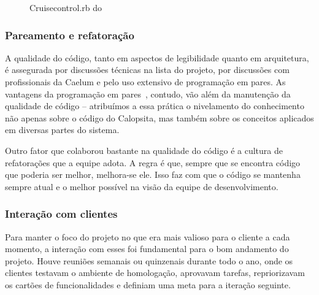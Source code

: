 \begin{figure}[H]
  \label{figura:cruisecontrol}
  \centering
  \caption{Cruisecontrol.rb do \calopsita{}}
\end{figure}

\subsubsection*{Pareamento e refatoração}

A qualidade do código, tanto em aspectos de legibilidade quanto em arquitetura, é assegurada por discussões técnicas na lista do projeto, por discussões com profissionais da Caelum e pelo uso extensivo de programação em pares. As vantagens da programação em pares~\cite{pair}, contudo, vão além da manutenção da qualidade de código -- atribuímos a essa prática o nivelamento do conhecimento não apenas sobre o código do Calopsita, mas também sobre os conceitos aplicados em diversas partes do sistema.

Outro fator que colaborou bastante na qualidade do código é a cultura de refatorações que a equipe adota. A regra é que, sempre que se encontra código que poderia ser melhor, melhora-se ele. Isso faz com que o código se mantenha sempre atual e o melhor possível na visão da equipe de desenvolvimento.

\subsubsection*{Interação com clientes}

Para manter o foco do projeto no que era mais valioso para o cliente a cada momento, a interação com esses foi fundamental para o bom andamento do projeto. Houve reuniões semanais ou quinzenais durante todo o ano, onde os clientes testavam o \calopsita{} ambiente de homologação, aprovavam tarefas,  repriorizavam os cartões de funcionalidades e definiam uma meta para a iteração seguinte. 

